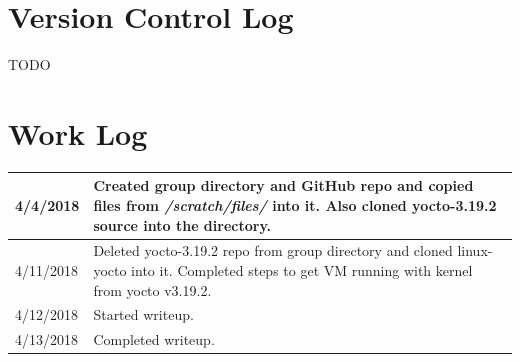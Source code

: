 \documentclass[onecolumn,draftclsnofoot, 10pt, compsoc]{IEEEtran}
\begin{document}
\section{Version Control Log}
	TODO
 
\section{Work Log}
\begin{center}
	\begin{tabular}{ |p{2cm}|p{12cm}| }
		\hline
		4/4/2018 & Created group directory and GitHub repo and copied files from \textit{/scratch/files/} into it.
		           Also cloned yocto-3.19.2 source into the directory. \\
		\hline
		4/11/2018 & Deleted yocto-3.19.2 repo from group directory and cloned linux-yocto into it.
		            Completed steps to get VM running with kernel from yocto v3.19.2. \\
		\hline
		4/12/2018 & Started writeup. \\
		\hline
		4/13/2018 & Completed writeup. \\
		\hline
	\end{tabular}
\end{center}
 
%
%
\end{document}
